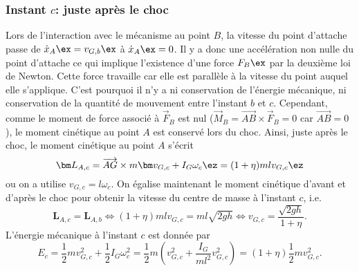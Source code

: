 \subsubsection*{Instant $c$: juste après le choc}
Lors de l'interaction avec le mécanisme au point $B$, la vitesse du point d'attache passe de $\dot x_{A}\ex =v_{G,b}\ex$ à $\dot x_{A}\ex =0$.
Il y a donc une accélération non nulle du point d'attache ce qui implique l'existence d'une force $F_B\ex$ par la deuxième loi de Newton.
Cette force travaille car elle est parallèle à la vitesse du point auquel elle s'applique.
C'est pourquoi il n'y a ni conservation de l'énergie mécanique, ni conservation de la quantité de mouvement entre l'instant $b$ et $c$.
Cependant, comme le moment de force associé à $\vec F_B$ est nul ($\vec M_B=\overrightarrow{AB}\times\vec F_B = 0$ car $\overrightarrow{AB}=0$), le moment cinétique au point $A$ est conservé lors du choc.
Ainsi, juste après le choc, le moment cinétique au point $A$ s'écrit
\begin{equation}
    \bm L_{A,c} =\overrightarrow{AG}\times m \bm v_{G,c} + I_G \omega_c \ez = (1+\eta)mlv_{G,c}\ez
\end{equation}
ou on a utilise $v_{G,c} =  l\omega_c$.
On égalise maintenant le moment cinétique d'avant et d'après le choc pour obtenir la vitesse du centre de masse à l'instant $c$, i.e.
\begin{equation}
    \bm L_{A,c} = \bm L_{A,b} \Leftrightarrow (1+\eta)mlv_{G,c} = ml\sqrt{2gh} \Leftrightarrow v_{G,c}= \frac{\sqrt{2gh}}{1+\eta}.
    \label{eq:mcin_A_c}
\end{equation}
L'énergie mécanique à l'instant $c$ est donnée par
\begin{equation}
E_{c} = \frac{1}{2}mv_{G,c}^2 + \frac{1}{2}I_G\omega_c^2 = \frac{1}{2}m\left(v_{G,c}^2 + \frac{I_G}{ml^2}v_{G,c}^2\right) = (1+\eta)\frac{1}{2}m v_{G,c}^2.
\end{equation}


